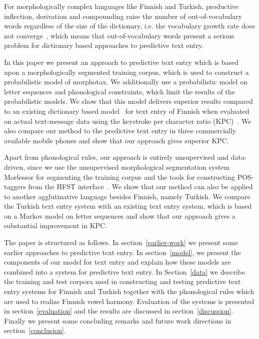 \documentclass{llncs}
\begin{document}
For morphologically complex languages like Finnish and Turkish,
productive inflection, derivation and compounding raise the number of
out-of-vocabulary words regardless of the size of the dictionary,
i.e. the vocabulary growth rate does not
converge~\cite{Creutz_morph-basedspeech}, which means that
out-of-vocabulary words present a serious problem for dictionary based
approaches to predictive text entry.

In this paper we present an approach to predictive text entry which is
based upon a morphologically segmented training corpus, which is used
to construct a probabilistic model of morphotax. We additionally use a
probabilistic model on letter sequences and phonological constraints,
which limit the results of the probabilistic models. We show that this
model delivers superior results compared to an existing dictionary
based model~\cite{silfverberg/2011/cla} for text entry of Finnish when
evaluated on actual text-message data using the keystroke per
character ratio (KPC)~\cite{MacKenzie02kspc}. We also compare our
method to the predictive text entry in three commercially available
mobile phones and show that our approach gives superior KPC.

Apart from phonological rules, our approach is entirely unsupervised
and data-driven, since we use the unsupervised morphological
segmentation system Morfessor \cite{Creutz07ACMTSLP} for segmenting
the training corpus and the tools for constructing POS-taggers from
the HFST interface~\cite{hfst/2011}. We show that our method can also
be applied to another agglutinative language besides Finnish, namely
Turkish. We compare the Turkish text entry system with an existing
text entry system, which is based on a Markov model on letter
sequences and show that our approach gives a substantial improvement
in KPC.

The paper is structured as follows. In section~\ref{earlier-work} we
present some earlier approaches to predictive text entry. In
section~\ref{model}, we present the components of our model for text
entry and explain how these models are combined into a system for
predictive text entry.  In Section~\ref{data} we describe the
training and test corpora used in constructing and testing predictive
text entry systems for Finnish and Turkish together with the
phonological rules which are used to realize Finnish vowel
harmony. Evaluation of the systems is presented in
section~\ref{evaluation} and the results are discussed in
section~\ref{discussion}. Finally we present some concluding remarks
and future work directions in section~\ref{conclusion}.
\end{document}
